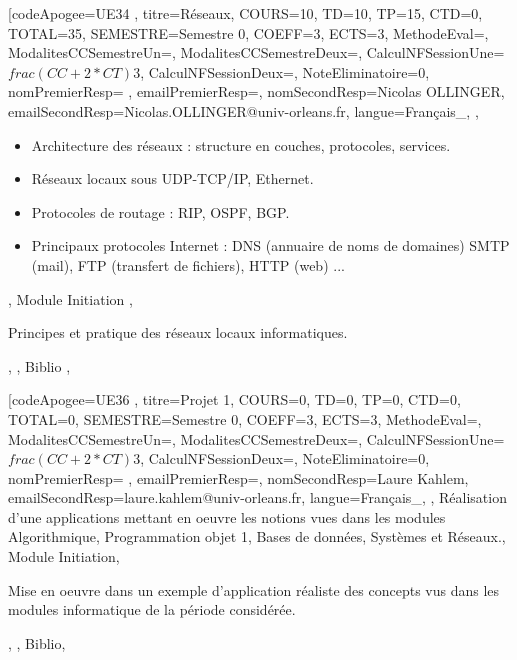 

\module[codeApogee={UE34 },
titre={Réseaux},
COURS={10},
TD={10},
TP={15},
CTD={0},
TOTAL={35},
SEMESTRE={Semestre 0},
COEFF={3},
ECTS={3},
MethodeEval={},
ModalitesCCSemestreUn={},
ModalitesCCSemestreDeux={},
CalculNFSessionUne={$frac{(CC+2*CT)}{3}$},
CalculNFSessionDeux={},
NoteEliminatoire={0},
nomPremierResp={ },
emailPremierResp={},
nomSecondResp={Nicolas OLLINGER},
emailSecondResp={Nicolas.OLLINGER@univ-orleans.fr},
langue={Français_},
{},
{\begin{itemize}

 
  \item Architecture des réseaux : structure en couches, protocoles, services.
  \item Réseaux locaux sous UDP-TCP/IP, Ethernet.
  \item Protocoles de routage : RIP, OSPF, BGP.
  \item Principaux protocoles Internet : DNS (annuaire de noms de domaines) SMTP (mail), FTP (transfert de fichiers), HTTP (web) ... 
 

\end{itemize}},
{Module Initiation
},
{\begin{itemize}
 
  \ObjItem Principes et pratique des réseaux locaux informatiques.
 

\end{itemize}},
{},
{Biblio
},

\vfill


\module[codeApogee={UE36 },
titre={Projet 1},
COURS={0},
TD={0},
TP={0},
CTD={0},
TOTAL={0},
SEMESTRE={Semestre 0},
COEFF={3},
ECTS={3},
MethodeEval={},
ModalitesCCSemestreUn={},
ModalitesCCSemestreDeux={},
CalculNFSessionUne={$frac{(CC+2*CT)}{3}$},
CalculNFSessionDeux={},
NoteEliminatoire={0},
nomPremierResp={ },
emailPremierResp={},
nomSecondResp={Laure Kahlem},
emailSecondResp={laure.kahlem@univ-orleans.fr},
langue={Français_},
{},
{Réalisation d'une applications mettant en oeuvre les notions vues dans les modules Algorithmique, Programmation objet 1, Bases de données, Systèmes et Réseaux.},
{Module Initiation},
{\begin{itemize}
\ObjItem Mise en oeuvre dans un exemple d'application réaliste des concepts vus dans les modules informatique de la période considérée.
\end{itemize}},
{},
{Biblio},

